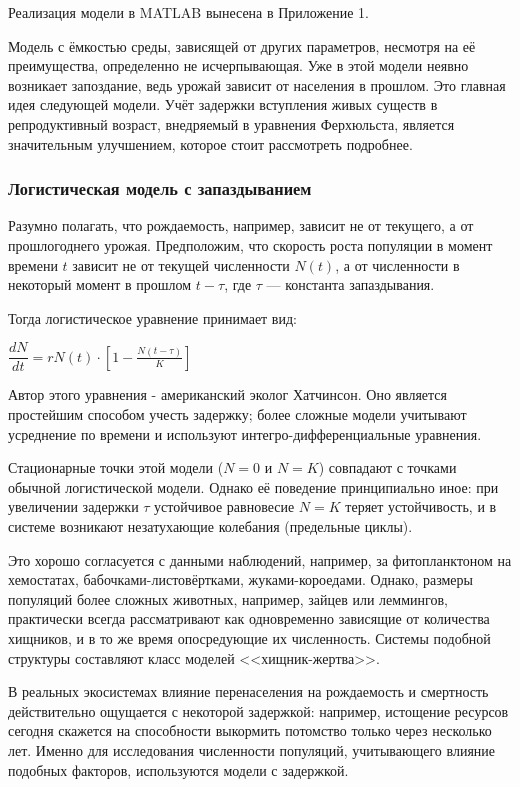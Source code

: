 \documentclass[a4paper, 14pt]{extarticle}
\begin{document}
Реализация модели в MATLAB вынесена в Приложение 1. 

Модель с ёмкостью среды, зависящей от других параметров, несмотря на её преимущества, определенно не исчерпывающая. Уже в этой модели неявно возникает запоздание, ведь урожай зависит от населения в прошлом. Это главная идея следующей модели. Учёт задержки вступления живых существ в репродуктивный возраст, внедряемый в уравнения Ферхюльста, является значительным улучшением, которое стоит рассмотреть подробнее.

\subsubsection{Логистическая модель с запаздыванием}

Разумно полагать, что рождаемость, например, зависит не от текущего, а от прошлогоднего урожая. Предположим, что скорость роста популяции в момент времени $t$ зависит не от текущей численности $N(t)$, а от численности в некоторый момент в прошлом $t - \tau $, где $\tau$ — константа запаздывания.

Тогда логистическое уравнение принимает вид:

\begin{center}
$\dfrac{dN}{dt} = rN(t)\cdot[1 - \frac{N(t - \tau)}{K}]$
\end{center}

Автор этого уравнения - американский эколог Хатчинсон. Оно является простейшим способом учесть задержку; более сложные модели учитывают усреднение по времени и используют интегро-дифференциальные уравнения. 

Стационарные точки этой модели ($N = 0$ и $N = K$) совпадают с точками обычной логистической модели. Однако её поведение принципиально иное: при увеличении задержки $\tau$ устойчивое равновесие $N = K$ теряет устойчивость, и в системе возникают незатухающие колебания (предельные циклы).

Это хорошо согласуется с данными наблюдений, например, за фитопланктоном на хемостатах, бабочками-листовёртками, жуками-короедами. Однако, размеры популяций более сложных животных, например, зайцев или леммингов, практически всегда рассматривают как одновременно зависящие от количества хищников, и в то же время опосредующие их численность. Системы подобной структуры составляют класс моделей <<хищник-жертва>>.

В реальных экосистемах влияние перенаселения на рождаемость и смертность действительно ощущается с некоторой задержкой: например, истощение ресурсов сегодня скажется на способности выкормить потомство только через несколько лет. Именно для исследования численности популяций, учитывающего влияние подобных факторов, используются модели с задержкой.
\end{document}
